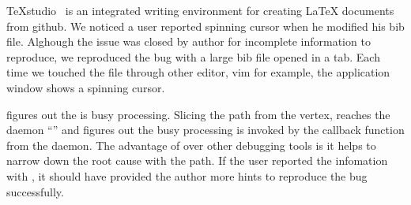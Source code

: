 TeXstudio~\cite{texstudio} is an integrated writing environment for creating
LaTeX documents from github. We noticed a user reported spinning cursor when he
modified his bib file. Alghough the issue was closed by author for incomplete
information to reproduce, we reproduced the bug with a large bib file opened in
a tab. Each time we touched the file through other editor, vim for example, the
application window shows a spinning cursor.

\xxx figures out the \spinningnode is busy processing. Slicing the path from
the vertex, \xxx reaches the daemon ``'' and figures out the busy
processing is invoked by the callback function from the daemon. The advantage of
\xxx over other debugging tools is it helps to narrow down the root cause with
the path. If the user reported the infomation with \xxx, it should have provided
the author more hints to reproduce the bug successfully.

